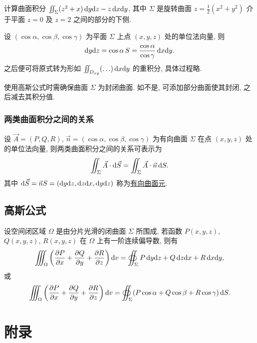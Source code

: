 \documentclass[a4paper,10pt,fleqn]{article}
\newcommand{\pdif}[2]{\frac{\partial #1}{\partial #2}}
\begin{document}
\begin{exmp}
    计算曲面积分 $\iint_\Sigma(z^2+x)\,{\rm d}y{\rm d}z-z\,{\rm d}x{\rm d}y$, 其中 $\Sigma$ 是旋转曲面
    $z=\frac{1}{2}(x^2+y^2)$ 介于平面 $z=0$ 及 $z=2$ 之间的部分的下侧.

    设 $(\cos\alpha,\cos\beta,\cos\gamma)$ 为平面 $\Sigma$ 上点 $(x,y,z)$ 处的单位法向量, 则
    \[
        {\rm d}y{\rm d}z=\cos\alpha\,S=\frac{\cos\alpha}{\cos\gamma}\,{\rm d}x{\rm d}y.
    \]
    之后便可将原式转为形如 $\iint_{D_{xy}}(\ldots)\,{\rm d}x{\rm d}y$ 的重积分, 具体过程略.
\end{exmp}

\begin{attn}
    使用高斯公式时需确保曲面 $\Sigma$ 为封闭曲面. 如不是, 可添加部分曲面使其封闭, 之后减去其积分值.
\end{attn}

\subsubsection*{两类曲面积分之间的关系}

设 $\vec{A}=(P,Q,R)$, $\vec{n}=(\cos\alpha,\cos\beta,\cos\gamma)$ 为有向曲面 $\Sigma$ 在点 $(x,y,z)$ 处的单位法向量,
则两类曲面积分之间的关系可表示为
\[
    \iint_\Sigma\vec{A}\cdot{\rm d}\vec{S}=\iint_\Sigma\vec{A}\cdot\vec{n}\,{\rm d}S.
\]
其中 ${\rm d}\vec{S}=\vec{n}S=({\rm d}y{\rm d}z,{\rm d}z{\rm d}x,{\rm d}y{\rm d}z)$ 称为\uline{有向曲面元}.

\subsection{高斯公式}

\begin{thm}
    设空间闭区域 $\Omega$ 是由分片光滑的闭曲面 $\Sigma$ 所围成, 若函数 $P(x,y,z)$, $Q(x,y,z)$, $R(x,y,z)$ 在 $\Omega$
    上有一阶连续偏导数, 则有
    \[
        \iiint_\Omega\left(\pdif{P}{x}+\pdif{Q}{y}+\pdif{R}{z}\right){\rm d}v=\oiint_\Sigma P\,{\rm d}y{\rm d}z+Q\,{\rm d}z{\rm d}x+R\,{\rm d}x{\rm d}y,
    \]
    或
    \[
        \iiint_\Omega\left(\pdif{P}{x}+\pdif{Q}{y}+\pdif{R}{z}\right){\rm d}v=\oiint_\Sigma(P\cos\alpha+Q\cos\beta+R\cos\gamma)\,{\rm d}S.
    \]
\end{thm}

\pagebreak

\section*{附录}
\end{document}
